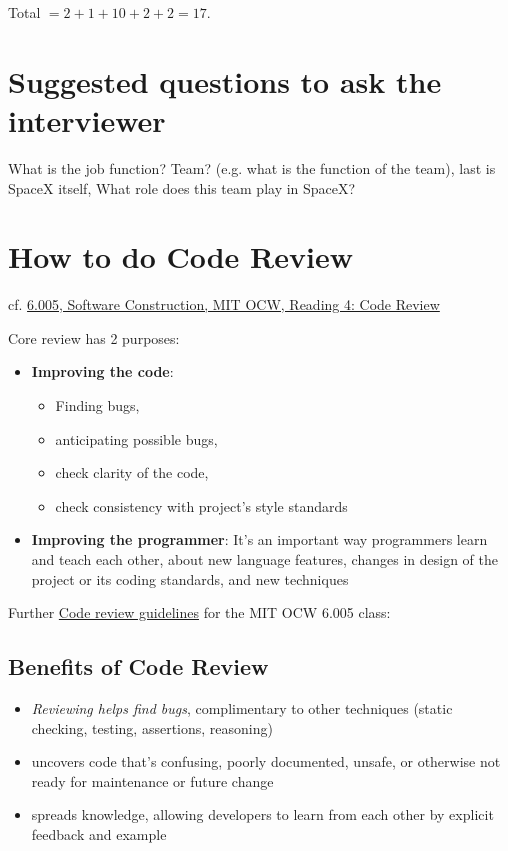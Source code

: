 \documentclass[10pt]{amsart}
\begin{document}
\begin{multicols*}{2}
Total $ = 2 + 1 + 10 + 2 + 2 = 17$.

\section{Suggested questions to ask the interviewer}

What is the job function? Team? (e.g. what is the function of the team), last is SpaceX itself, What role does this team play in SpaceX?

\section{How to do Code Review}

cf. \href{https://ocw.mit.edu/ans7870/6/6.005/s16/classes/04-code-review/index.html}{6.005, Software Construction, MIT OCW, Reading 4: Code Review}

Core review has 2 purposes:
\begin{itemize}
	\item \textbf{Improving the code}:
	\begin{itemize}
		\item Finding bugs,
		\item anticipating possible bugs,
		\item check clarity of the code,
		\item check consistency with project's style standards
	\end{itemize}
\item \textbf{Improving the programmer}: It's an important way programmers learn and teach each other, about new language features, changes in design of the project or its coding standards, and new techniques
\end{itemize}

Further \href{https://ocw.mit.edu/ans7870/6/6.005/s16/general/code-review.html}{Code review guidelines} for the MIT OCW 6.005 class:

\subsection{Benefits of Code Review}

\begin{itemize}
	\item \emph{Reviewing helps find bugs}, complimentary to other techniques (static checking, testing, assertions, reasoning)
	\item uncovers code that's confusing, poorly documented, unsafe, or otherwise not ready for maintenance or future change
	\item spreads knowledge, allowing developers to learn from each other by explicit feedback and example 
\end{itemize}


\end{multicols*}
\end{document}
